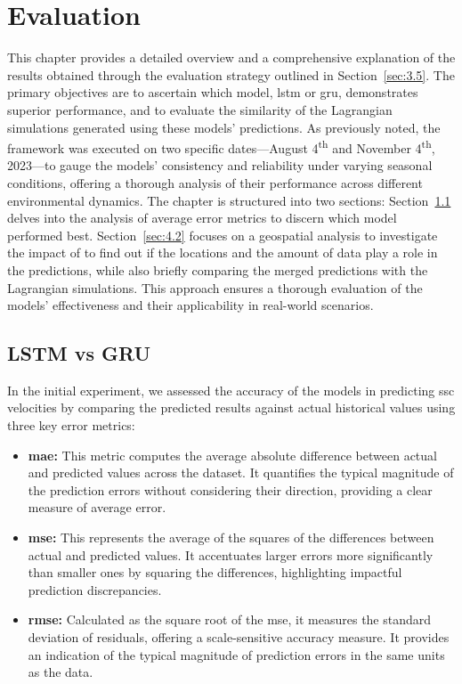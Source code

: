 \graphicspath{{content/chapters/4_evaluation/evaluation_figures}}
\newtheorem{hypothesis}{Hypothesis}[chapter]

\chapter{Evaluation}
\label{chp:evaluation}

This chapter provides a detailed overview and a comprehensive explanation of the results obtained through the evaluation strategy outlined in Section~\ref{sec:3.5}. The primary objectives are to ascertain which model, \acrshort{lstm} or \acrshort{gru}, demonstrates superior performance, and to evaluate the similarity of the Lagrangian simulations generated using these models' predictions. As previously noted, the framework was executed on two specific dates—August 4\textsuperscript{th} and November 4\textsuperscript{th}, 2023—to gauge the models' consistency and reliability under varying seasonal conditions, offering a thorough analysis of their performance across different environmental dynamics. The chapter is structured into two sections: Section~\ref{sec:4.1} delves into the analysis of average error metrics to discern which model performed best. Section~\ref{sec:4.2} focuses on a geospatial analysis to investigate the impact of to find out if the locations and the amount of data play a role in the predictions, while also briefly comparing the merged predictions with the Lagrangian simulations. This approach ensures a thorough evaluation of the models' effectiveness and their applicability in real-world scenarios.

\section{LSTM vs GRU}
\label{sec:4.1}

In the initial experiment, we assessed the accuracy of the models in predicting \acrshort{ssc} velocities by comparing the predicted results against actual historical values using three key error metrics:
\begin{itemize}
    \item \textbf{\acrshort{mae}:} This metric computes the average absolute difference between actual and predicted values across the dataset. It quantifies the typical magnitude of the prediction errors without considering their direction, providing a clear measure of average error.
    \item \textbf{\acrshort{mse}:} This represents the average of the squares of the differences between actual and predicted values. It accentuates larger errors more significantly than smaller ones by squaring the differences, highlighting impactful prediction discrepancies.
    \item \textbf{\acrshort{rmse}:} Calculated as the square root of the \acrshort{mse}, it measures the standard deviation of residuals, offering a scale-sensitive accuracy measure. It provides an indication of the typical magnitude of prediction errors in the same units as the data.
\end{itemize}


